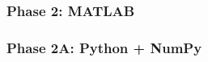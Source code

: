 \documentclass[
    xcolor={svgnames,dvipsnames},
    hyperref={colorlinks, citecolor=DeepPink4, linkcolor=DarkRed, urlcolor=DarkBlue}
    ]{beamer}  %
\newcommand{\1}{\mathbbm 1}
\begin{document}
\begin{frame}
    \frametitle{Phase 2: MATLAB}

    
    \begin{figure}
       \begin{center} %
       \end{center}
    \end{figure}


\end{frame}




\begin{frame}
    \frametitle{Phase 2A: Python + NumPy}

    
    \begin{figure}
       \begin{center} %
       \end{center}
    \end{figure}


\end{frame}
\end{document}
